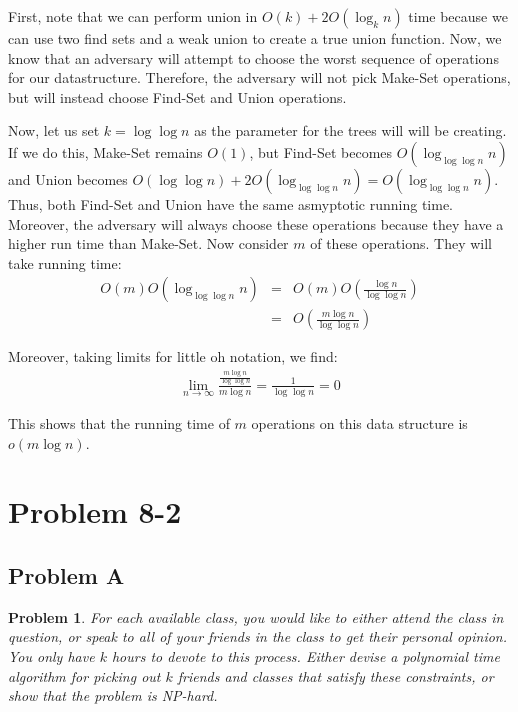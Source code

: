 \documentclass[psamsfonts]{amsart}
\newtheorem{prob}{Problem}[section]
\newenvironment{sol}{{\bfseries Solution}}{\qedsymbol}
\theoremstyle{definition}
\theoremstyle{remark}
\numberwithin{equation}{section}
\begin{document}
\begin{sol}
First, note that we can perform union in $O(k) + 2O(\log_k n)$ time because we can use two find sets and a weak union to create a true union function. Now, we know that an adversary will attempt to choose the worst sequence of operations for our datastructure. Therefore, the adversary will not pick Make-Set operations, but will instead choose Find-Set and Union operations. 

Now, let us set $k = \log \log n$ as the parameter for the trees will will be creating. If we do this, Make-Set remains $O(1)$, but Find-Set becomes $O(\log_{\log \log n} n )$ and Union becomes $O(\log \log n) + 2 O(\log_{\log \log n} n) = O(\log_{\log \log n} n)$. Thus, both Find-Set and Union have the same asmyptotic running time. Moreover, the adversary will always choose these operations because they have a higher run time than Make-Set. Now consider $m$ of these operations. They will take running time:
\begin{eqnarray}
O(m) O(\log_{\log \log n} n) &=& O(m) O \left( \frac{\log n}{\log \log n} \right) \\
&=& O \left(\frac{m \log n}{\log \log n} \right) 
\end{eqnarray}

Moreover, taking limits for little oh notation, we find:
\begin{eqnarray}
\lim_{n \to \infty} \frac{\frac{m \log n}{\log \log n}}{m \log n} = \frac{1}{\log \log n} = 0
\end{eqnarray}

This shows that the running time of $m$ operations on this data structure is $o(m \log n)$. 
\end{sol}


\section{Problem 8-2}

\subsection{Problem A}

\begin{prob}
For each available class, you would like to either attend the class in question, or speak to all of your friends in the class to get their personal opinion. You only have $k$ hours to devote to this process. Either devise a polynomial time algorithm for picking out $k$ friends and classes that satisfy these constraints, or show that the problem is NP-hard. 
\end{prob}
\end{document}
